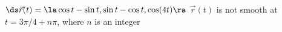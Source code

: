 {$\ds \vec r(t) = \la \cos t-\sin t, \sin t - \cos t,\cos(4t)\ra$
}
{
$\vec r(t)$ is not smooth at $t=3\pi/4+n\pi$, where $n$ is an integer
}

